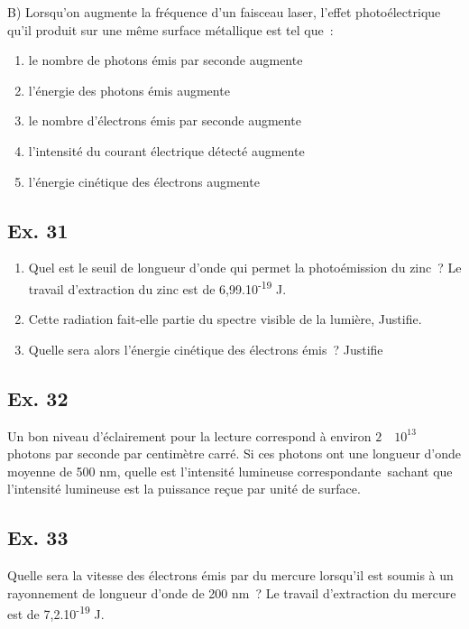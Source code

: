 {B) Lorsqu'on augmente la fréquence d'un faisceau laser, l'effet
photoélectrique qu'il produit sur une même surface métallique est tel
que~:
\begin{enumerate}
  \item    le nombre de photons émis par seconde augmente
  \item    l'énergie des photons émis augmente
  \item  le nombre d'électrons émis par seconde augmente
  \item    l'intensité du courant électrique détecté augmente
  \item    l'énergie cinétique des électrons augmente
\end{enumerate}

\subsection{Ex. 31}

\begin{enumerate}
\item  Quel est le seuil de longueur d'onde qui permet la photoémission du
  zinc~? Le travail d'extraction du zinc est de
  6,99.10\textsuperscript{-19} J.
\item  Cette radiation fait-elle partie du spectre visible de la lumière,
  Justifie.
\item  Quelle sera alors l'énergie cinétique des électrons émis~? Justifie
\end{enumerate}

\subsection{Ex. 32}

Un bon niveau d'éclairement pour la lecture correspond à environ
$2 \quad 10^{13}$ photons par seconde par centimètre carré. Si
ces photons ont une longueur d'onde moyenne de 500 nm, quelle est
l'intensité lumineuse correspondante~sachant que l'intensité lumineuse
est la puissance reçue par unité de surface.

\subsection{Ex. 33}

Quelle sera la vitesse des électrons émis par du mercure lorsqu'il est
soumis à un rayonnement de longueur d'onde de 200 nm~? Le travail
d'extraction du mercure est de 7,2.10\textsuperscript{-19} J.

}
